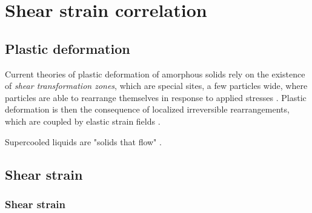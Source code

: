 \documentclass[class=report, float=false, crop=false]{standalone}
\begin{document}
\chapter{Shear strain correlation}
\label{chap:strain}

\section{Plastic deformation}
\label{section:plastic_deformation}


Current theories of plastic deformation of amorphous solids rely on the existence of \textit{shear transformation zones}, which are special sites, a few particles wide, where particles are able to rearrange themselves in response to applied stresses \cite{falk1998dynamics}. Plastic deformation is then the consequence of localized irreversible rearrangements, which are coupled by elastic strain fields \cite{nicolas2014spatiotemporal}.

Supercooled liquids are "solids that flow" \cite{dyre2006colloquium, chattoraj2013elastic}.

\section{Shear strain}

\subsection{Shear strain}
\end{document}
